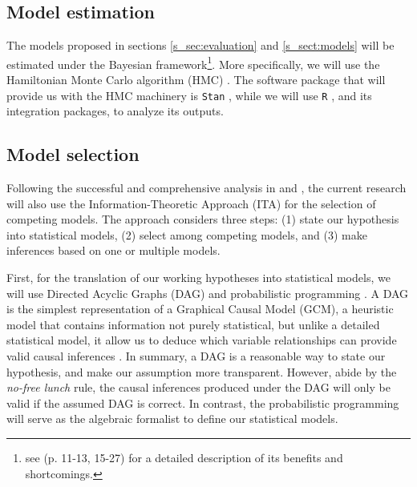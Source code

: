 \subsection{Model estimation} \label{s_sect:estimation}
%
The models proposed in sections \ref{s_sec:evaluation} and \ref{s_sect:models} will be estimated under the Bayesian framework\footnote{see \citet{Rivera_2021} (p. 11-13, 15-27) for a detailed description of its benefits and shortcomings.}. More specifically, we will use the Hamiltonian Monte Carlo algorithm (HMC) \cite{Duane_et_al_1987, Betancourt_et_al_2013, Neal_2012}. The software package that will provide us with the HMC machinery is \texttt{Stan} \cite{Stan_2020}, while we will use \texttt{R} \cite{R_2015, RStan_2020}, and its integration packages, to analyze its outputs.
%
%
\subsection{Model selection} \label{s_sect:model_sel}
%
Following the successful and comprehensive analysis in \citet{vanDaal_2020} and \citet{Lesterhuis_2018}, the current research will also use the Information-Theoretic Approach (ITA) \citep{Anderson_2008, Chamberlain_1965} for the selection of competing models. The approach considers three steps: (1) state our hypothesis into statistical models, (2) select among competing models, and (3) make inferences based on one or multiple models.

First, for the translation of our working hypotheses into statistical models, we will use Directed Acyclic Graphs (DAG) and probabilistic programming \citep{Jaynes_2003}. A DAG is the simplest representation of a Graphical Causal Model (GCM), a heuristic model that contains information not purely statistical, but unlike a detailed statistical model, it allow us to deduce which variable relationships can provide valid causal inferences \citep{Hernan_et_al_2020, McElreath_2020}. In summary, a DAG is a reasonable way to state our hypothesis, and make our assumption more transparent. However, abide by the \textit{no-free lunch} rule, the causal inferences produced under the DAG will only be valid if the assumed DAG is correct. In contrast, the probabilistic programming will serve as the algebraic formalist to define our statistical models.

